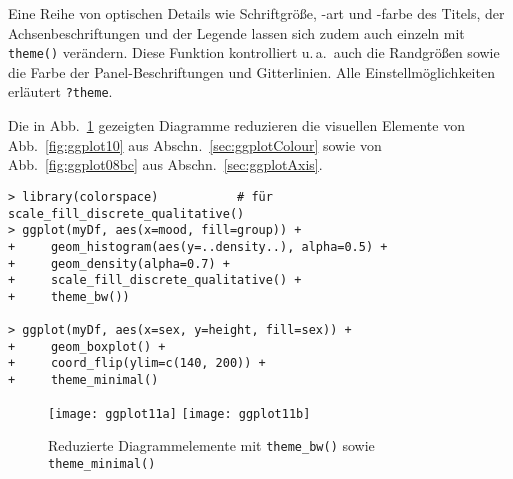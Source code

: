 Eine Reihe von optischen Details wie Schriftgröße, -art und -farbe des Titels, der Achsenbeschriftungen und der Legende lassen sich zudem auch einzeln mit \lstinline!theme()! verändern. Diese Funktion kontrolliert u.\,a.\ auch die Randgrößen sowie die Farbe der Panel-Beschriftungen und Gitterlinien. Alle Einstellmöglichkeiten erläutert \lstinline!?theme!.

Die in Abb.\ \ref{fig:ggplot11} gezeigten Diagramme reduzieren die visuellen Elemente von Abb.\ \ref{fig:ggplot10} aus Abschn.\ \ref{sec:ggplotColour} sowie von Abb.\ \ref{fig:ggplot08bc} aus Abschn.\ \ref{sec:ggplotAxis}.
\begin{lstlisting}
> library(colorspace)           # für scale_fill_discrete_qualitative()
> ggplot(myDf, aes(x=mood, fill=group)) +
+     geom_histogram(aes(y=..density..), alpha=0.5) +
+     geom_density(alpha=0.7) +
+     scale_fill_discrete_qualitative() +
+     theme_bw())

> ggplot(myDf, aes(x=sex, y=height, fill=sex)) +
+     geom_boxplot() +
+     coord_flip(ylim=c(140, 200)) +
+     theme_minimal()
\end{lstlisting}

\begin{figure}[ht]
\centering
\texttt{[image: ggplot11a]}
\texttt{[image: ggplot11b]}
\vspace*{-0.5em}
\caption{Reduzierte Diagrammelemente mit \lstinline!theme_bw()! sowie \lstinline!theme_minimal()!}
\label{fig:ggplot11}
\end{figure}
